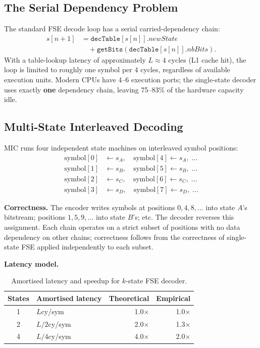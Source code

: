\documentclass[journal]{IEEEtran}
\begin{document}
\subsection{The Serial Dependency Problem}

The standard FSE decode loop has a serial carried-dependency chain:
\begin{align}
  s[n{+}1] &= \texttt{decTable}[s[n]].\textit{newState} \nonumber\\
            &\quad + \texttt{getBits}\!\left(\texttt{decTable}[s[n]].\textit{nbBits}\right).
\end{align}
With a table-lookup latency of approximately $L \approx 4$ cycles (L1 cache
hit), the loop is limited to roughly one symbol per 4 cycles, regardless of
available execution units. Modern CPUs have 4--6 execution ports; the
single-state decoder uses exactly \textbf{one} dependency chain, leaving
75--83\% of the hardware capacity idle.

\subsection{Multi-State Interleaved Decoding}

MIC runs four independent state machines on interleaved symbol positions:
\begin{align*}
  \text{symbol}[0] &\leftarrow s_A, \quad \text{symbol}[4] \leftarrow s_A, \;\ldots \\
  \text{symbol}[1] &\leftarrow s_B, \quad \text{symbol}[5] \leftarrow s_B, \;\ldots \\
  \text{symbol}[2] &\leftarrow s_C, \quad \text{symbol}[6] \leftarrow s_C, \;\ldots \\
  \text{symbol}[3] &\leftarrow s_D, \quad \text{symbol}[7] \leftarrow s_D, \;\ldots
\end{align*}

\textbf{Correctness.} The encoder writes symbols at positions $0,4,8,\ldots$
into state $A$'s bitstream; positions $1,5,9,\ldots$ into state $B$'s; etc. The
decoder reverses this assignment. Each chain operates on a strict subset of
positions with no data dependency on other chains; correctness follows from the
correctness of single-state FSE applied independently to each subset.

\textbf{Latency model.}

\begin{table}[htbp]
\centering
\caption{Amortised latency and speedup for $k$-state FSE decoder.}
\label{tab:latency}
\begin{tabular}{clrr}
\toprule
States & Amortised latency & Theoretical & Empirical \\
\midrule
1 & $L$\;cy/sym   & 1.0$\times$ & 1.0$\times$ \\
2 & $L/2$\;cy/sym & 2.0$\times$ & 1.3$\times$ \\
4 & $L/4$\;cy/sym & 4.0$\times$ & 2.0$\times$ \\
\bottomrule
\end{tabular}
\end{table}
\end{document}
